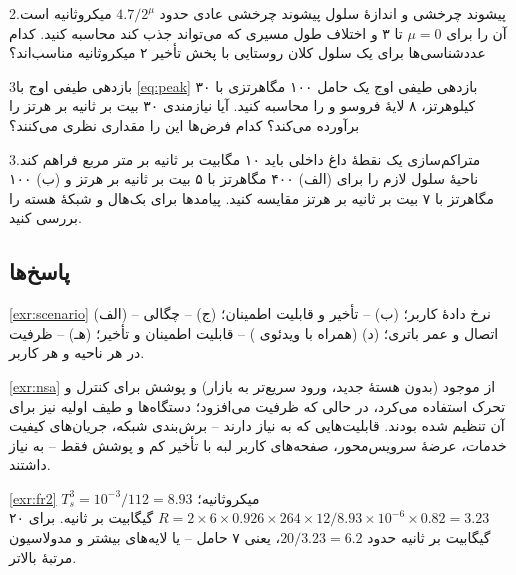 \documentclass[11pt,a4paper]{article}
\begin{document}
\begin{exercisebox}{2}{پیشوند چرخشی و اندازهٔ سلول}\label{exr:cp}
پیشوند چرخشی عادی حدود $4.7/2^\mu$ میکروثانیه است. آن را برای $\mu = 0$ تا ۳ و اختلاف طول مسیری که می‌تواند جذب کند محاسبه
کنید. کدام عددشناسی‌ها برای یک سلول کلان روستایی با پخش تأخیر ۲ میکروثانیه مناسب‌اند؟
\end{exercisebox}

\begin{exercisebox}{3}{بازدهی طیفی اوج}\label{exr:se}
با \cref{eq:peak} بازدهی طیفی اوج یک حامل ۱۰۰ مگاهرتزی  با ۳۰ کیلوهرتز، ۸ لایهٔ فروسو و  را محاسبه کنید.
آیا نیازمندی ۳۰ بیت بر ثانیه بر هرتز  را برآورده می‌کند؟ کدام فرض‌ها این را مقداری نظری می‌کنند؟
\end{exercisebox}

\begin{exercisebox}{3}{متراکم‌سازی}\label{exr:dense}
یک نقطهٔ داغ داخلی باید ۱۰ مگابیت بر ثانیه بر متر مربع فراهم کند. ناحیهٔ سلول لازم را برای (الف) ۴۰۰ مگاهرتز با ۵ بیت بر ثانیه
بر هرتز و (ب) ۱۰۰ مگاهرتز با ۷ بیت بر ثانیه بر هرتز مقایسه کنید. پیامدها برای بک‌هال و شبکهٔ هسته را بررسی کنید.
\end{exercisebox}

\subsection*{پاسخ‌ها}

\begin{solutionbox}{\ref{exr:scenario}}
(الف)  -- نرخ دادهٔ کاربر؛ (ب)  -- تأخیر و قابلیت اطمینان؛ (ج)  -- چگالی اتصال و عمر باتری؛
(د)  (همراه با ویدئوی ) -- قابلیت اطمینان و تأخیر؛ (هـ)  -- ظرفیت در هر ناحیه و هر کاربر.
\end{solutionbox}

\begin{solutionbox}{\ref{exr:nsa}}
 از  موجود (بدون هستهٔ جدید، ورود سریع‌تر به بازار) و پوشش  برای کنترل و تحرک استفاده می‌کرد،
در حالی که  ظرفیت می‌افزود؛ دستگاه‌ها و طیف اولیه نیز برای آن تنظیم شده بودند. قابلیت‌هایی که به  نیاز دارند --
برش‌بندی شبکه، جریان‌های کیفیت خدمات، عرضهٔ سرویس‌محور، صفحه‌های کاربر لبه با تأخیر کم و پوشش فقط  -- به 
نیاز داشتند.
\end{solutionbox}

\begin{solutionbox}{\ref{exr:fr2}}
$T_s^{3} = 10^{-3}/112 = 8.93$ میکروثانیه؛ $R = 2\times6\times0.926\times264\times12/8.93\times10^{-6}\times0.82 = 3.23$ گیگابیت بر
ثانیه. برای ۲۰ گیگابیت بر ثانیه حدود $20/3.23 = 6.2$، یعنی ۷ حامل -- یا لایه‌های بیشتر و مدولاسیون مرتبهٔ بالاتر.
\end{solutionbox}
\end{document}
